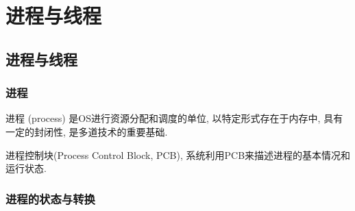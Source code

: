 \section{进程与线程}
\subsection{进程与线程}
\subsubsection{进程}
进程 (process) 是OS进行资源分配和调度的单位, 以特定形式存在于内存中, 具有一定的封闭性, 是多道技术的重要基础. 

进程控制块(Process Control Block, PCB), 系统利用PCB来描述进程的基本情况和
运行状态. 

\subsubsection{进程的状态与转换}